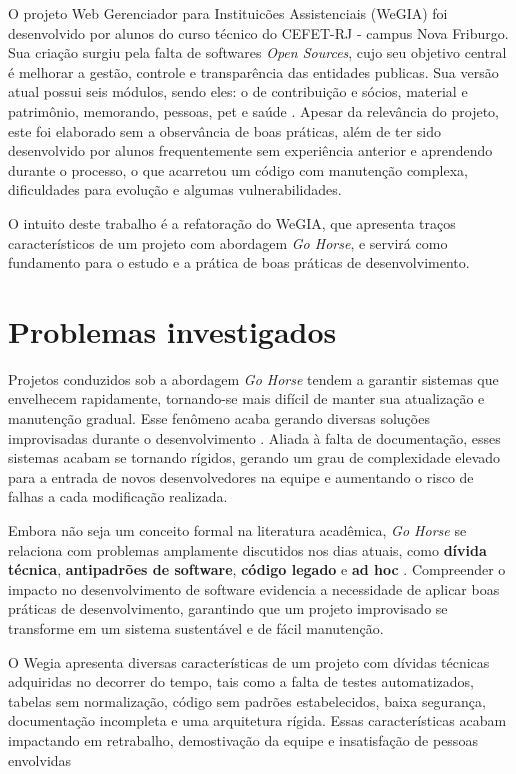     O projeto Web Gerenciador para Instituicões Assistenciais (WeGIA) foi desenvolvido por alunos do curso técnico do CEFET-RJ - campus Nova Friburgo. Sua criação surgiu pela falta de softwares \textit{Open Sources}, cujo seu objetivo central é melhorar a gestão, controle e transparência das entidades publicas. Sua versão atual possui seis módulos, sendo eles: o de contribuição e sócios, material e patrimônio, memorando, pessoas, pet e saúde \cite[]{latinoware2024wegia}. Apesar da relevância do projeto, este foi elaborado sem a observância de boas práticas, além de ter sido desenvolvido por alunos frequentemente sem experiência anterior e aprendendo durante o processo, o que acarretou um código com manutenção complexa, dificuldades para evolução e algumas vulnerabilidades.

    O intuito deste trabalho é a refatoração do WeGIA, que apresenta traços característicos de um projeto com abordagem \textit{Go Horse}, e servirá como fundamento para o estudo e a prática de boas práticas de desenvolvimento.

    \section{Problemas investigados}

    Projetos conduzidos sob a abordagem \textit{Go Horse} tendem a garantir sistemas que envelhecem rapidamente, tornando-se mais difícil de manter sua atualização e manutenção gradual. Esse fenômeno acaba gerando diversas soluções improvisadas durante o desenvolvimento \cite[]{oliveira2019investigaccao}. Aliada à falta de documentação, esses sistemas acabam se tornando rígidos, gerando um grau de complexidade elevado para a entrada de novos desenvolvedores na equipe e aumentando o risco de falhas a cada modificação realizada.

    Embora não seja um conceito formal na literatura acadêmica,  \textit{Go Horse} se relaciona com problemas amplamente discutidos nos dias atuais, como \textbf{dívida técnica}, \textbf{antipadrões de software}, \textbf{código legado} e \textbf{ad hoc} \cite[]{dantas2002suporte, de2021identificaccao}. Compreender o impacto no desenvolvimento de software evidencia a necessidade de aplicar boas práticas de desenvolvimento, garantindo que um projeto improvisado se transforme em um sistema sustentável e de fácil manutenção.

    O Wegia apresenta diversas características de um projeto com dívidas técnicas adquiridas no decorrer do tempo, tais como a falta de testes automatizados, tabelas sem normalização, código sem padrões estabelecidos, baixa segurança, documentação incompleta e uma arquitetura rígida. Essas características acabam impactando em retrabalho, demostivação da equipe e insatisfação de pessoas envolvidas \cite[]{borges2022investigaccao}

